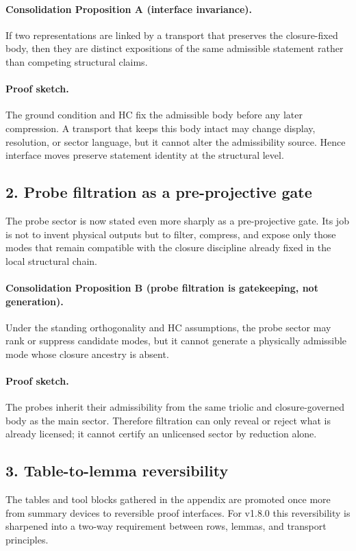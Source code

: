 \paragraph{Consolidation Proposition A (interface invariance).}
If two representations are linked by a transport that preserves the closure-fixed
body, then they are distinct expositions of the same admissible statement rather
than competing structural claims.

\paragraph{Proof sketch.}
The ground condition and HC fix the admissible body before any later compression.
A transport that keeps this body intact may change display, resolution, or
sector language, but it cannot alter the admissibility source. Hence interface
moves preserve statement identity at the structural level.

\subsection*{2. Probe filtration as a pre-projective gate}
The probe sector is now stated even more sharply as a pre-projective gate. Its
job is not to invent physical outputs but to filter, compress, and expose only
those modes that remain compatible with the closure discipline already fixed in
the local structural chain.

\paragraph{Consolidation Proposition B (probe filtration is gatekeeping, not generation).}
Under the standing orthogonality and HC assumptions, the probe sector may rank or
suppress candidate modes, but it cannot generate a physically admissible mode
whose closure ancestry is absent.

\paragraph{Proof sketch.}
The probes inherit their admissibility from the same triolic and closure-governed
body as the main sector. Therefore filtration can only reveal or reject what is
already licensed; it cannot certify an unlicensed sector by reduction alone.

\subsection*{3. Table-to-lemma reversibility}
The tables and tool blocks gathered in the appendix are promoted once more from
summary devices to reversible proof interfaces. For v1.8.0 this reversibility
is sharpened into a two-way requirement between rows, lemmas, and transport
principles.

